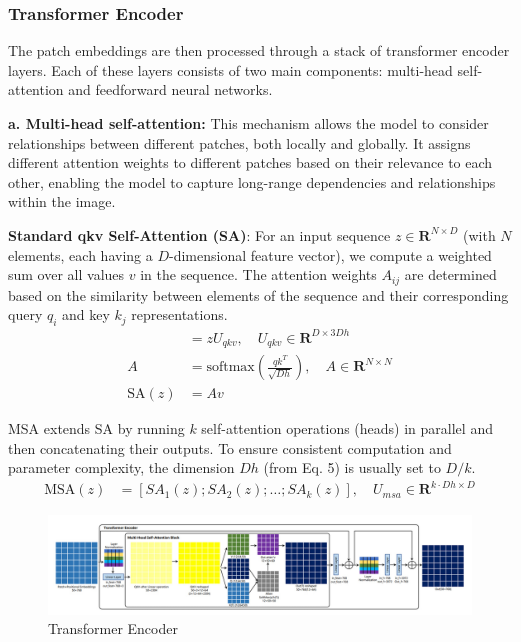 \subsubsection{Transformer Encoder}
The patch embeddings are then processed through a stack of transformer encoder layers. Each of these layers consists of two main components: multi-head self-attention and feedforward neural networks.

\noindent \textbf{a. Multi-head self-attention:} This mechanism allows the model to consider relationships between different patches, both locally and globally. It assigns different attention weights to different patches based on their relevance to each other, enabling the model to capture long-range dependencies and relationships within the image.

\noindent \textbf{Standard qkv Self-Attention (SA)}:
For an input sequence $z \in \mathbf{R}^{N \times D}$ (with $N$ elements, each having a $D$-dimensional feature vector), we compute a weighted sum over all values $v$ in the sequence. The attention weights $A_{ij}$ are determined based on the similarity between elements of the sequence and their corresponding query $q_i$ and key $k_j$ representations.
\begin{align}
    [q, k, v]    & = zU_{qkv}, \quad U_{qkv} \in \mathbf{R}^{D \times 3Dh} \label{eq:qkv}                                               \\
    A            & = \text{softmax}\left(\frac{qk^T}{\sqrt{Dh}}\right), \quad A \in \mathbf{R}^{N \times N} \label{eq:attentionweights} \\
    \text{SA}(z) & = Av \label{eq:selfattention}
\end{align}

\noindent MSA extends SA by running $k$ self-attention operations (heads) in parallel and then concatenating their outputs. To ensure consistent computation and parameter complexity, the dimension $Dh$ (from Eq. 5) is usually set to $D/k$.
\begin{align}
    \text{MSA}(z) & = [SA_1(z); SA_2(z); \ldots ; SA_k(z)], \quad U_{msa} \in \mathbf{R}^{k \cdot Dh \times D} \label{eq:multiheadselfattention}
\end{align}

\begin{figure}[htbp]
    \centering
    \includegraphics[width=6in]{img/encoderdetails.jpg}
    \caption{{Transformer Encoder}}
\end{figure}

